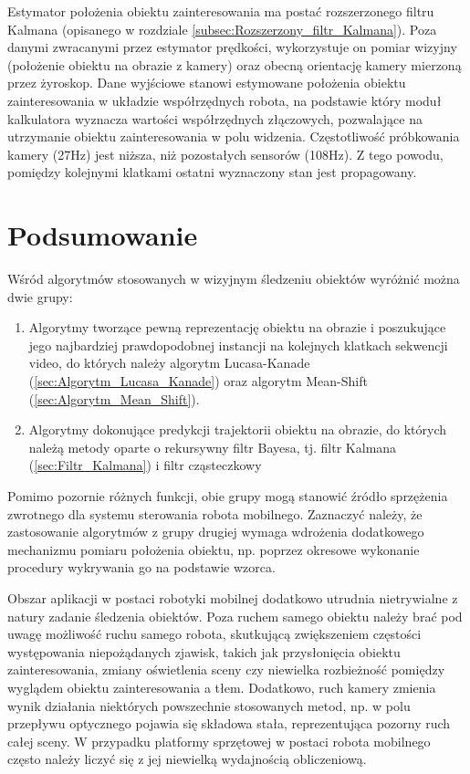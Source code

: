 {Estymator położenia obiektu zainteresowania ma postać rozszerzonego filtru Kalmana (opisanego w rozdziale \ref{subsec:Rozszerzony_filtr_Kalmana}). Poza danymi zwracanymi przez estymator prędkości, wykorzystuje on pomiar wizyjny (położenie obiektu na obrazie z kamery) oraz obecną orientację kamery mierzoną przez żyroskop. Dane wyjściowe stanowi estymowane położenia obiektu zainteresowania w układzie współrzędnych robota, na podstawie który moduł kalkulatora wyznacza wartości współrzędnych złączowych, pozwalające na utrzymanie obiektu zainteresowania w polu widzenia. Częstotliwość próbkowania kamery (27Hz) jest niższa, niż pozostałych sensorów (108Hz). Z tego powodu, pomiędzy kolejnymi klatkami ostatni wyznaczony stan jest propagowany.


\section{Podsumowanie}
\label{sec:Przyklady_podsumowanie}

Wśród algorytmów stosowanych w wizyjnym śledzeniu obiektów wyróżnić można dwie grupy:

\begin{enumerate}
	\item Algorytmy tworzące pewną reprezentację obiektu na obrazie i poszukujące jego najbardziej prawdopodobnej instancji na kolejnych klatkach sekwencji video, do których należy algorytm Lucasa-Kanade (\ref{sec:Algorytm_Lucasa_Kanade}) oraz algorytm Mean-Shift (\ref{sec:Algorytm_Mean_Shift}).
	\item Algorytmy dokonujące predykcji trajektorii obiektu na obrazie, do których należą metody oparte o rekursywny filtr Bayesa, tj. filtr Kalmana (\ref{sec:Filtr_Kalmana}) i filtr cząsteczkowy
\end{enumerate}

Pomimo pozornie różnych funkcji, obie grupy mogą stanowić źródło sprzężenia zwrotnego dla systemu sterowania robota mobilnego. Zaznaczyć należy, że zastosowanie algorytmów z grupy drugiej wymaga wdrożenia dodatkowego mechanizmu  pomiaru położenia obiektu, np. poprzez okresowe wykonanie procedury wykrywania go na podstawie wzorca.

Obszar aplikacji w postaci robotyki mobilnej dodatkowo utrudnia nietrywialne z natury zadanie śledzenia obiektów. Poza ruchem samego obiektu należy brać pod uwagę możliwość ruchu samego robota, skutkującą zwiększeniem częstości występowania niepożądanych zjawisk, takich jak przysłonięcia obiektu zainteresowania, zmiany oświetlenia sceny czy niewielka rozbieżność pomiędzy wyglądem obiektu zainteresowania a tłem. Dodatkowo, ruch kamery zmienia wynik działania niektórych powszechnie stosowanych metod, np. w polu przepływu optycznego pojawia się składowa stała, reprezentująca pozorny ruch całej sceny. W przypadku platformy sprzętowej w postaci robota mobilnego często należy liczyć się z jej niewielką wydajnością obliczeniową.

}
